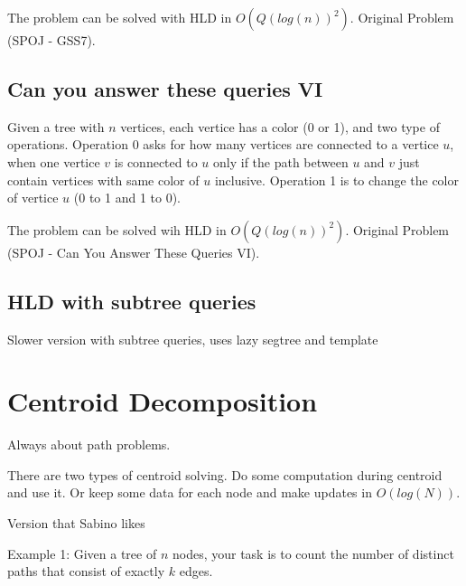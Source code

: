         The problem can be solved with HLD in $O(Q(log(n))^2)$. Original Problem (SPOJ - GSS7).
        
        
        
        \subsection{Can you answer these queries VI}
        Given a tree with $n$ vertices, each vertice has a color (0 or 1), and two type of operations. Operation 0 asks for how many vertices are connected to a vertice $u$, when one vertice $v$ is connected to $u$ only if the path between $u$ and $v$ just contain vertices with same color of $u$ inclusive. Operation 1 is to change the color of vertice $u$ (0 to 1 and 1 to 0).
        
        The problem can be solved wih HLD in $O(Q(log(n))^2)$. Original Problem (SPOJ - Can You Answer These Queries VI).
        
        
        

         \subsection{HLD with subtree queries}
        Slower version with subtree queries, uses lazy segtree and  template
        
        
        
    \section{Centroid Decomposition}


    Always about path problems.
    
    There are two types of centroid solving. Do some computation during centroid and use it.
     Or keep some data for each node and make updates in $O(log(N))$. 

    

    Version that Sabino likes

    

    Example 1:
    Given a tree of $n$ nodes, your task is to count the number of distinct paths that consist of exactly $k$ edges.

    
    
